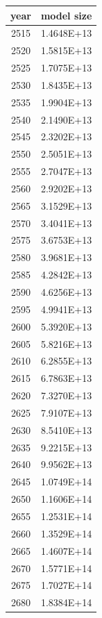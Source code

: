 \documentclass[a4paper]{article}
\begin{document}
    \begin{tabular}{| c | c |}
    	\hline
    	year & model size \\\hline
    	2515 & 1.4648E+13 \\\hline
    	2520 & 1.5815E+13 \\\hline
    	2525 & 1.7075E+13 \\\hline
    	2530 & 1.8435E+13 \\\hline
    	2535 & 1.9904E+13 \\\hline
    	2540 & 2.1490E+13 \\\hline
    	2545 & 2.3202E+13 \\\hline
    	2550 & 2.5051E+13 \\\hline
    	2555 & 2.7047E+13 \\\hline
    	2560 & 2.9202E+13 \\\hline
    	2565 & 3.1529E+13 \\\hline
    	2570 & 3.4041E+13 \\\hline
    	2575 & 3.6753E+13 \\\hline
    	2580 & 3.9681E+13 \\\hline
    	2585 & 4.2842E+13 \\\hline
    	2590 & 4.6256E+13 \\\hline
    	2595 & 4.9941E+13 \\\hline
    	2600 & 5.3920E+13 \\\hline
    	2605 & 5.8216E+13 \\\hline
    	2610 & 6.2855E+13 \\\hline
    	2615 & 6.7863E+13 \\\hline
    	2620 & 7.3270E+13 \\\hline
    	2625 & 7.9107E+13 \\\hline
    	2630 & 8.5410E+13 \\\hline
    	2635 & 9.2215E+13 \\\hline
    	2640 & 9.9562E+13 \\\hline
    	2645 & 1.0749E+14 \\\hline
    	2650 & 1.1606E+14 \\\hline
    	2655 & 1.2531E+14 \\\hline
    	2660 & 1.3529E+14 \\\hline
    	2665 & 1.4607E+14 \\\hline
    	2670 & 1.5771E+14 \\\hline
    	2675 & 1.7027E+14 \\\hline
    	2680 & 1.8384E+14 \\\hline

\end{tabular}
\end{document}
